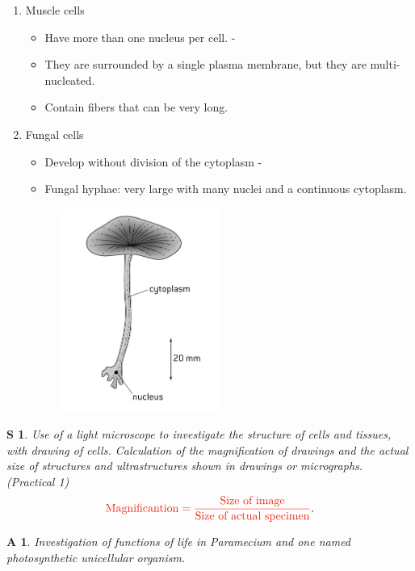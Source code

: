 \documentclass[12pt, a4paper]{article}
\newtheorem{skl}{S}[subsection]
\newtheorem{app}{A}[subsection]
\begin{document}
\begin{enumerate}
    \item Muscle cells
    \begin{itemize}
        \item Have more than one nucleus per cell. - {\color{blue}{challenges the idea that a cell has one nucleus.}}
        \item They are surrounded by a single plasma membrane, but they are multi-nucleated. 
        \item Contain fibers that can be very long. 
    \end{itemize}
    \item Fungal cells
    \begin{itemize}
        \item Develop without division of the cytoplasm - {\color{blue}{challenges the idea that a cell is a single unit}}
        \item Fungal hyphae: very large with many nuclei and a continuous cytoplasm. 
    \end{itemize}
    \begin{figure}[H]
        \center
        \includegraphics[width=0.5\textwidth]{fig1.1.png}
    \end{figure}
\end{enumerate}
\begin{skl}
    Use of a light microscope to investigate the structure of cells and tissues, with drawing of cells. Calculation of the magnification of drawings and the actual size of structures and ultrastructures shown in drawings or micrographs. (Practical 1)
    $${\color{red}{\text{Magnificantion}=\frac{\text{Size of image}}{\text{Size of actual specimen}}}}.$$
\end{skl}
\begin{app}
    Investigation of functions of life in \textit{Paramecium} and one named photosynthetic unicellular organism.
\end{app}
\end{document}
